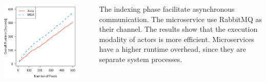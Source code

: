 \documentclass[final,hyperref={pdfpagelabels=true}]{beamer}
\begin{document}
\begin{frame}
\begin{columns}[t]
\begin{column}{.46\textwidth}
      \begin{columns}[t]
        \begin{column}{.4\textwidth}
          \includegraphics[width=1\textwidth]{graphics/eval-index-overall.pdf}
        \end{column}
        \begin{column}{.05\textwidth}
        \end{column}
        \begin{column}{.55\textwidth}
          {\lmodern
            The indexing phase facilitate asynchronous communication. The microservice use RabbitMQ as their channel. The results show that the execution modality of actors is more efficient. Microservices have a higher runtime overhead, since they are separate system processes. 
          }
        \end{column}
      \end{columns}


\end{column}
\end{columns}
\end{frame}
\end{document}
